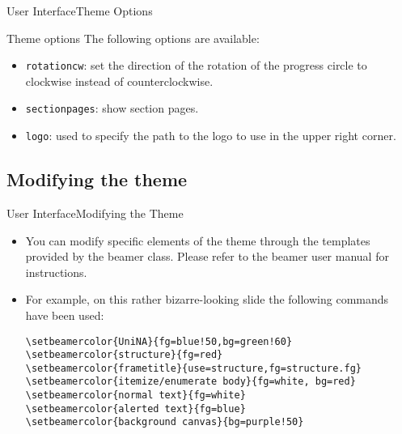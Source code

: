 \documentclass[10pt,aspectratio=43
	]{beamer}
\begin{document}
\begin{frame}{User Interface}{Theme Options}
  \begin{block}{Theme options}
    The following options are available:
  \begin{itemize}
	\item {\tt rotationcw}: set the direction of the rotation of the progress circle 
	to clockwise instead of counterclockwise.
    \item {\tt sectionpages}: show section pages.
    \item {\tt logo}: used to specify the path to the logo to use in the upper right corner.
  \end{itemize}
  \end{block}
\end{frame}

\subsection{Modifying the theme}
{
\begin{frame}[fragile]{User Interface}{Modifying the Theme}
  \begin{itemize}[<+->]
	\item You can modify specific elements of the theme through the 
	templates provided by the beamer class. Please refer to the beamer user manual for instructions.
    \item For example, on this rather bizarre-looking slide the following commands have been used:
	\begin{verbatim}
\setbeamercolor{UniNA}{fg=blue!50,bg=green!60}
\setbeamercolor{structure}{fg=red}
\setbeamercolor{frametitle}{use=structure,fg=structure.fg}
\setbeamercolor{itemize/enumerate body}{fg=white, bg=red}
\setbeamercolor{normal text}{fg=white}
\setbeamercolor{alerted text}{fg=blue}
\setbeamercolor{background canvas}{bg=purple!50}
	\end{verbatim}
  \end{itemize}
\end{frame}
}
\end{document}
